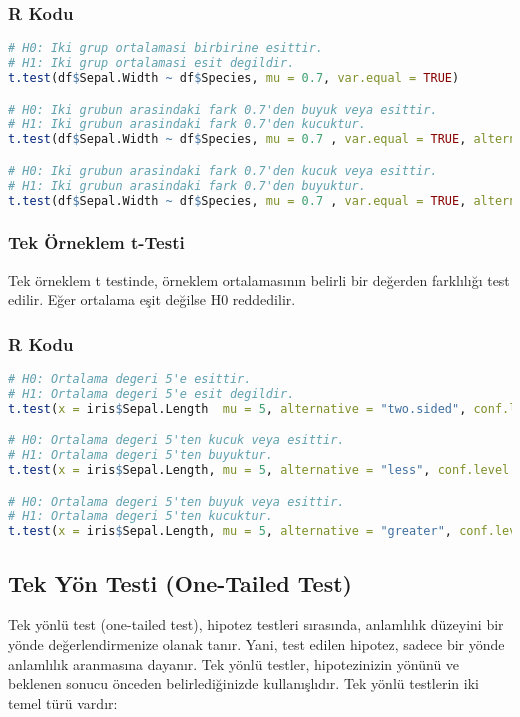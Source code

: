 \subsubsection{R Kodu}

\begin{lstlisting}[language=R]
# H0: Iki grup ortalamasi birbirine esittir.
# H1: Iki grup ortalamasi esit degildir.
t.test(df$Sepal.Width ~ df$Species, mu = 0.7, var.equal = TRUE)

# H0: Iki grubun arasindaki fark 0.7'den buyuk veya esittir.
# H1: Iki grubun arasindaki fark 0.7'den kucuktur.
t.test(df$Sepal.Width ~ df$Species, mu = 0.7 , var.equal = TRUE, alternative = "less")

# H0: Iki grubun arasindaki fark 0.7'den kucuk veya esittir.
# H1: Iki grubun arasindaki fark 0.7'den buyuktur.
t.test(df$Sepal.Width ~ df$Species, mu = 0.7 , var.equal = TRUE, alternative = "greater")
\end{lstlisting}

\subsubsection{Tek Örneklem t-Testi}
Tek örneklem t testinde, örneklem ortalamasının belirli bir değerden farklılığı test edilir. Eğer ortalama eşit değilse H0 reddedilir.

\subsubsection{R Kodu}

\begin{lstlisting}[language=R]
# H0: Ortalama degeri 5'e esittir.
# H1: Ortalama degeri 5'e esit degildir.
t.test(x = iris$Sepal.Length  mu = 5, alternative = "two.sided", conf.level = 0.95)

# H0: Ortalama degeri 5'ten kucuk veya esittir.
# H1: Ortalama degeri 5'ten buyuktur.
t.test(x = iris$Sepal.Length, mu = 5, alternative = "less", conf.level = 0.95)

# H0: Ortalama degeri 5'ten buyuk veya esittir.
# H1: Ortalama degeri 5'ten kucuktur.
t.test(x = iris$Sepal.Length, mu = 5, alternative = "greater", conf.level = 0.95)
\end{lstlisting}

\newpage

\subsection{Tek Yön Testi (One-Tailed Test)}
Tek yönlü test (one-tailed test), hipotez testleri sırasında, anlamlılık düzeyini bir yönde değerlendirmenize olanak tanır. Yani, test edilen hipotez, sadece bir yönde anlamlılık aranmasına dayanır. Tek yönlü testler, hipotezinizin yönünü ve beklenen sonucu önceden belirlediğinizde kullanışlıdır. Tek yönlü testlerin iki temel türü vardır:

